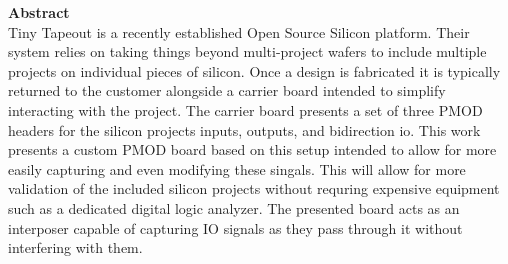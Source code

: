 \textbf{Abstract}\\
Tiny Tapeout is a recently established Open Source Silicon platform. 
Their system relies on taking things beyond multi-project wafers to include multiple projects on individual pieces of silicon. 
Once a design is fabricated it is typically returned to the customer alongside a carrier board intended to simplify interacting with the project. 
The carrier board presents a set of three PMOD headers for the silicon projects inputs, outputs, and bidirection io. 
This work presents a custom PMOD board based on this setup intended to allow for more easily capturing and even modifying these singals. 
This will allow for more validation of the included silicon projects without requring expensive equipment such as a dedicated digital logic analyzer.
The presented board acts as an interposer capable of capturing IO signals as they pass through it without interfering with them.